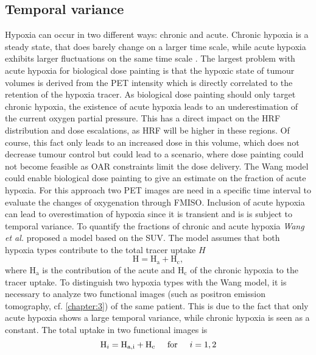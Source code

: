 \subsection{Temporal variance}
Hypoxia can occur in two different ways: chronic and acute. Chronic hypoxia is a steady state, that does barely change on a larger time scale, while acute hypoxia exhibits larger fluctuations on the same time scale \cite{pmid9783887, pmid18086391,pmid19203843, pmid15234030, pmid17543402, pmid16098619, pmid17674980, pmid18313529}. The largest problem with acute hypoxia for biological dose painting is that the hypoxic state of tumour volumes is derived from the PET intensity which is directly correlated to the retention of the hypoxia tracer. As biological dose painting should only target chronic hypoxia, the existence of acute hypoxia leads to an underestimation of the current oxygen partial pressure. This has a direct impact on the HRF distribution and dose escalations, as HRF will be higher in these regions. Of course, this fact only leads to an increased dose in this volume, which does not decrease tumour control but could lead to a scenario, where dose painting could not become feasible as OAR constraints limit the dose delivery. The Wang model \cite{pmid19928070} could enable biological dose painting to give an estimate on the fraction of acute hypoxia. For this approach two PET images are need in a specific time interval to evaluate the changes of oxygenation through FMISO. Inclusion of acute hypoxia can lead to overestimation of hypoxia since it is transient and is is subject to temporal variance. To quantify the fractions of chronic and acute hypoxia \textit{Wang et al.} \cite{pmid19928070} proposed a model based on the SUV. The model assumes that both hypoxia types contribute to the total tracer uptake $H$
\begin{equation}
\mathrm{H} = \mathrm{H}_\mathrm{a} + \mathrm{H}_\mathrm{c},
\end{equation}
where $ \mathrm{H}_\mathrm{a}$ is the contribution of the acute and $ \mathrm{H}_\mathrm{c}$ of the chronic hypoxia to the tracer uptake. To distinguish two hypoxia types with the Wang model, it is necessary to analyze two functional images (such as positron emission tomography, cf. \ref{chapter:3}) of the same patient. This is due to the fact that only acute hypoxia shows a large temporal variance, while chronic hypoxia is seen as a constant. The total uptake in two functional images is
\begin{equation}
\mathrm{H}_i = \mathrm{H}_\mathrm{a,i} + \mathrm{H}_\mathrm{c} \hspace{0.5cm}\mathrm{for}\hspace{0.5cm}i=1,2
\end{equation}
